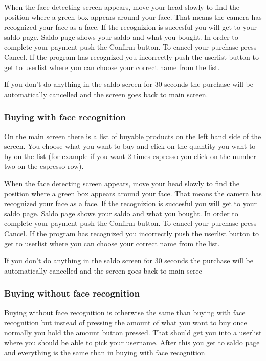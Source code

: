 \documentclass[11pt]{article}
\begin{document}
When the face detecting screen appears, move your head slowly to find the position where a green box appears around your face. That means the camera has recognized your face as a face. If the recognizion is succesful you will get to your saldo page. Saldo page shows your saldo and what you bought. In order to complete your payment push the Confirm button. To cancel your purchase press Cancel. If the program has recognized you incorrectly push the userlist button to get to userlist where you can choose your correct name from the list.

If you don’t do anything in the saldo screen for 30 seconds the purchase will be automatically cancelled and the screen goes back to main screen.

\subsubsection*{Buying with face recognition}
On the main screen there is a list of buyable products on the left hand side of the screen. You choose what you want to buy and click on the quantity you want to by on the list (for example if you want 2 times espresso you click on the number two on the espresso row).

When the face detecting screen appears, move your head slowly to find the position where a green box appears around your face. That means the camera has recognized your face as a face. If the recognizion is succesful you will get to your saldo page. Saldo page shows your saldo and what you bought. In order to complete your payment push the Confirm button. To cancel your purchase press Cancel. If the program has recognized you incorrectly push the userlist button to get to userlist where you can choose your correct name from the list.

If you don’t do anything in the saldo screen for 30 seconds the purchase will be automatically cancelled and the screen goes back to main scree

\subsubsection*{Buying without face recognition}
Buying without face recognition is otherwise the same than buying with face recognition but instead of pressing the amount of what you want to buy once normally you hold the amount button pressed. That should get you into a userlist where you should be able to pick your username. After this you get to saldo page and everything is the same than in buying with face recognition
\end{document}
